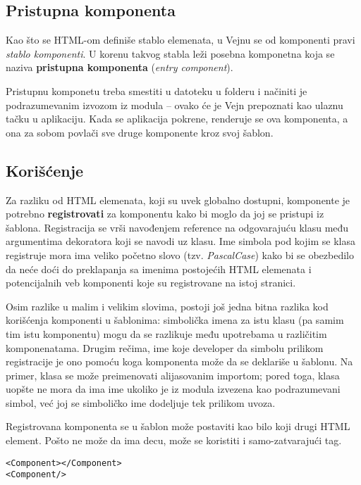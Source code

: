 \subsection{Pristupna komponenta}

Kao što se HTML-om definiše stablo elemenata, u Vejnu se od komponenti pravi \emph{stablo komponenti}.
U korenu takvog stabla leži posebna komponetna koja se naziva \textbf{pristupna komponenta} (\textsl{entry component}).

Pristupnu komponetu treba smestiti u datoteku  u folderu  i načiniti je podrazumevanim izvozom iz modula -- ovako će je Vejn prepoznati kao ulaznu tačku u aplikaciju.
Kada se aplikacija pokrene, renderuje se ova komponenta, a ona za sobom povlači sve druge komponente kroz svoj šablon.

\subsection{Korišćenje}

Za razliku od HTML elemenata, koji su uvek globalno dostupni, komponente je potrebno \textbf{registrovati} za komponentu kako bi moglo da joj se pristupi iz šablona.
Registracija se vrši navođenjem reference na odgovarajuću klasu među argumentima dekoratora  koji se navodi uz klasu.
Ime simbola pod kojim se klasa registruje mora ima veliko početno slovo (tzv. \textsl{PascalCase}) kako bi se obezbedilo da neće doći do preklapanja sa imenima postojećih HTML elemenata i potencijalnih veb komponenti koje su registrovane na istoj stranici.

Osim razlike u malim i velikim slovima, postoji još jedna bitna razlika kod korišćenja komponenti u šablonima: simbolička imena za istu klasu (pa samim tim istu komponentu) mogu da se razlikuje među upotrebama u različitim komponenatama.
Drugim rečima, ime koje developer da simbolu prilikom registracije je ono pomoću koga komponenta može da se deklariše u šablonu.
Na primer, klasa se može preimenovati alijasovanim importom; pored toga, klasa uopšte ne mora da ima ime ukoliko je iz modula izvezena kao podrazumevani simbol, već joj se simboličko ime dodeljuje tek prilikom uvoza.

Registrovana komponenta se u šablon može postaviti kao bilo koji drugi HTML element.
Pošto ne može da ima decu, može se koristiti i samo-zatvarajući tag.

\begin{verbatim}
<Component></Component>
<Component/>
\end{verbatim}

